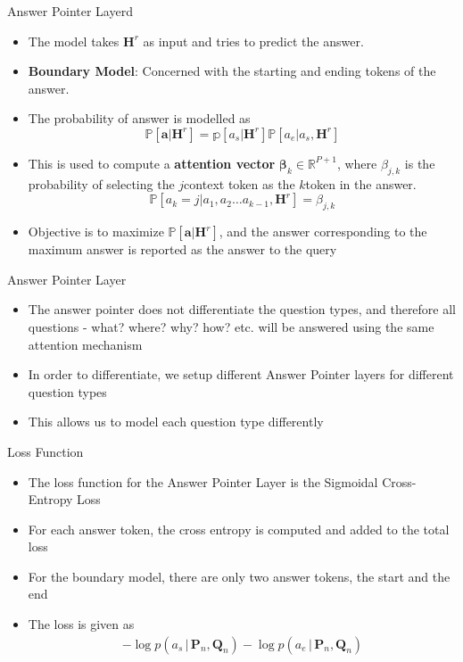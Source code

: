 \documentclass[10pt]{beamer}
\def\*#1{\mathbf{#1}}
\begin{document}
\begin{frame}{Answer Pointer Layerd}
	\begin{itemize}[<+- | alert@+>]
		\item The model takes $\*H^r$ as input and tries to predict the answer.
		\item \textbf{Boundary Model}: Concerned with the starting and ending tokens of the answer.
		\item The probability of answer is modelled as $$\mathbb{P}[\*a|\*H^r] = \mathbb{p}[a_s|\*H^r]\mathbb{P}[a_e|a_s,\*H^r]$$
		\item This is used to compute a \textbf{attention vector} $\*\beta_k \in \mathbb{R}^{P+1}$, where $\beta_{j, k}$ is the probability of selecting the $j$\tth context token as the $k$\tth token in the answer.
			$$\mathbb{P}[a_k = j| a_1, a_2 \dots a_{k - 1}, \*H^r] =	\beta_{j, k}$$
		\item Objective is to maximize $\mathbb{P}[\*a|\*H^r]$, and the answer corresponding to the maximum answer is reported as the answer to the query
	\end{itemize}

\end{frame}

\begin{frame}{Answer Pointer Layer}
	\begin{itemize}[<+- | alert@+>]
		\item The answer pointer does not differentiate the question types, and therefore all questions - what? where? why? how? etc. will be answered using the same attention mechanism
		\item In order to differentiate, we setup different Answer Pointer layers for different question types
		\item This allows us to model each question type differently
	\end{itemize}
\end{frame}

\begin{frame}{Loss Function}

	\begin{itemize}[<+- | alert@+>]
		\item The loss function for the Answer Pointer Layer is the Sigmoidal Cross-Entropy Loss
		\item For each answer token, the cross entropy is computed and added to the total loss
		\item For the boundary model, there are only two answer tokens, the start and the end
		\item The loss is given as 
			\begin{align*}
				- \log{p(a_s \,|\, \boldsymbol{P}_n, \boldsymbol{Q}_n)} - \log{p(a_e \,|\, \boldsymbol{P}_n, \boldsymbol{Q}_n)}
			\end{align*}
	\end{itemize}

\end{frame}
\end{document}

